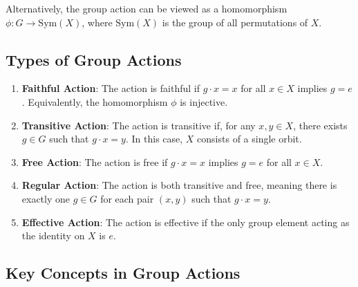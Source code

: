 \documentclass[11pt]{article}
\theoremstyle{definition}
\begin{document}
Alternatively, the group action can be viewed as a homomorphism \( \phi : G \to \text{Sym}(X) \), where \( \text{Sym}(X) \) is the group of all permutations of \( X \).

\subsection*{Types of Group Actions}

\begin{enumerate}
    \item \textbf{Faithful Action}: The action is faithful if \( g \cdot x = x \) for all \( x \in X \) implies \( g = e \). Equivalently, the homomorphism \( \phi \) is injective.
    
    \item \textbf{Transitive Action}: The action is transitive if, for any \( x, y \in X \), there exists \( g \in G \) such that \( g \cdot x = y \). In this case, \( X \) consists of a single orbit.
    
    \item \textbf{Free Action}: The action is free if \( g \cdot x = x \) implies \( g = e \) for all \( x \in X \).
    
    \item \textbf{Regular Action}: The action is both transitive and free, meaning there is exactly one \( g \in G \) for each pair \( (x, y) \) such that \( g \cdot x = y \).
    
    \item \textbf{Effective Action}: The action is effective if the only group element acting as the identity on \( X \) is \( e \).
\end{enumerate}

\subsection*{Key Concepts in Group Actions}
\end{document}
